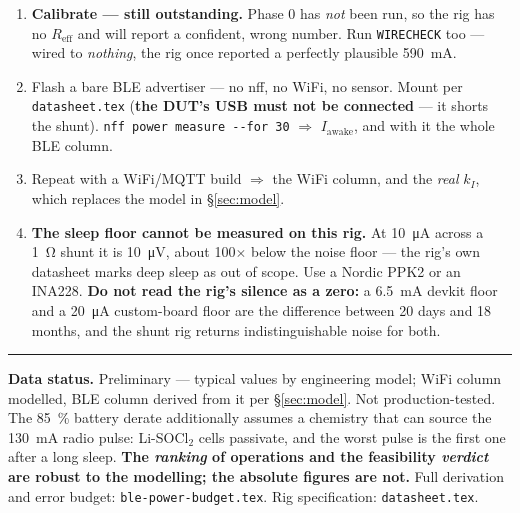\documentclass[10pt,a4paper]{article}
\newcommand{\bad}[1]{\textcolor{warn}{\textbf{#1}}}
\begin{document}
\begin{enumerate}[leftmargin=*,itemsep=0.5mm]
  \item \bad{Calibrate --- still outstanding.} Phase 0 has \emph{not} been run, so the rig has no $R_\text{eff}$ and will
        report a confident, wrong number. Run \texttt{WIRECHECK} too --- wired to \emph{nothing},
        the rig once reported a perfectly plausible \SI{590}{\milli\ampere}.
  \item Flash a bare BLE advertiser --- no nff, no WiFi, no sensor. Mount per \texttt{datasheet.tex}
        (\bad{the DUT's USB must not be connected} --- it shorts the shunt).
        \texttt{nff power measure -{}-for 30} $\Rightarrow$ $I_\text{awake}$, and with it the whole
        BLE column.
  \item Repeat with a WiFi/MQTT build $\Rightarrow$ the WiFi column, and the \emph{real} $k_I$,
        which replaces the model in \S\ref{sec:model}.
  \item \bad{The sleep floor cannot be measured on this rig.} At \SI{10}{\micro\ampere} across a
        \SI{1}{\ohm} shunt it is \SI{10}{\micro\volt}, about \num{100}$\times$ below the noise floor
        --- the rig's own datasheet marks deep sleep as out of scope. Use a Nordic PPK2 or an
        INA228. \textbf{Do not read the rig's silence as a zero:} a \SI{6.5}{\milli\ampere} devkit
        floor and a \SI{20}{\micro\ampere} custom-board floor are the difference between 20 days and
        18 months, and the shunt rig returns indistinguishable noise for both.
\end{enumerate}

\vspace{2mm}
\hrule
\vspace{1.5mm}
{\footnotesize
\textbf{Data status.} Preliminary --- typical values by engineering model; WiFi column modelled,
BLE column derived from it per \S\ref{sec:model}. Not production-tested. The \SI{85}{\percent}
battery derate additionally assumes a chemistry that can source the \SI{130}{\milli\ampere} radio
pulse: Li-SOCl$_2$ cells passivate, and the worst pulse is the first one after a long sleep.
\textbf{The \emph{ranking} of operations and the feasibility \emph{verdict} are robust to the
modelling; the absolute figures are not.} Full derivation and error budget:
\texttt{ble-power-budget.tex}. Rig specification: \texttt{datasheet.tex}.
\par}
\end{document}
